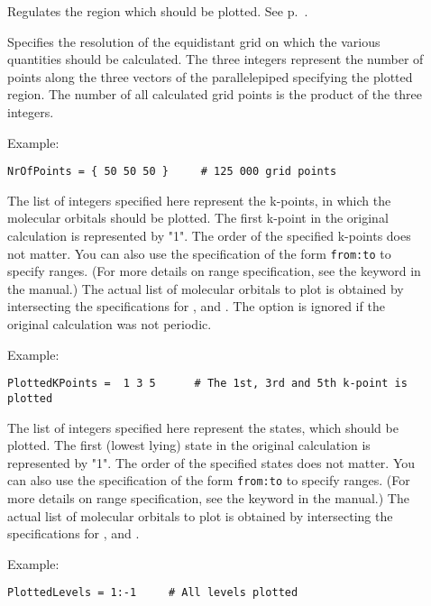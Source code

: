 \begin{description}
\item[] Regulates the region which should be
  plotted. See p.~.
\item[] Specifies the resolution of the equidistant grid on
  which the various quantities should be calculated. The three
  integers represent the number of points along the three vectors of
  the parallelepiped specifying the plotted region. The number of all
  calculated grid points is the product of the three integers.

Example:
\begin{verbatim}
NrOfPoints = { 50 50 50 }     # 125 000 grid points
\end{verbatim}

\item[] The list of integers specified here
  represent the k-points, in which the molecular orbitals should be
  plotted. The first k-point in the original \dftbp{} calculation is
  represented by "1". The order of the specified k-points does not
  matter. You can also use the specification of the form
  \verb|from:to| to specify ranges. (For more details on range
  specification, see the  keyword in the \dftbp{}
  manual.) The actual list of molecular orbitals to plot is obtained
  by intersecting the specifications for ,
   and .  The option is ignored if
  the original calculation was not periodic.

Example:
\begin{verbatim}
PlottedKPoints =  1 3 5      # The 1st, 3rd and 5th k-point is plotted
\end{verbatim}

\item[] The list of integers specified here
  represent the states, which should be plotted. The first (lowest
  lying) state in the original \dftbp{} calculation is represented by
  "1". The order of the specified states does not matter. You can also
  use the specification of the form \verb|from:to| to specify
  ranges. (For more details on range specification, see the
   keyword in the \dftbp{} manual.) The actual list of
  molecular orbitals to plot is obtained by intersecting the
  specifications for ,  and
  .

Example:
\begin{verbatim}
PlottedLevels = 1:-1     # All levels plotted
\end{verbatim}


\end{description}
